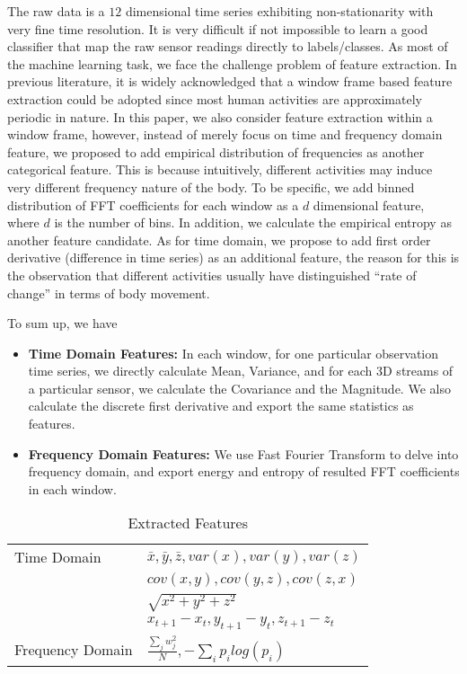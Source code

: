 The raw data is a $12$ dimensional time series exhibiting non-stationarity with very fine time resolution. It is very difficult if not impossible to learn a good classifier that map the raw sensor readings directly to labels/classes. As most of the machine learning task, we face the challenge problem of feature extraction. In previous literature, it is widely acknowledged that a window frame based feature extraction could be adopted since most human activities are approximately periodic in nature. In this paper, we also consider feature extraction within a window frame, however, instead of merely focus on time and frequency domain feature, we proposed to add empirical distribution of frequencies as another categorical  feature. This is because intuitively, different activities may induce very different frequency nature of the body. To be specific, we add binned distribution of FFT coefficients for each window as a $d$ dimensional feature, where $d$ is the number of bins. In addition, we calculate the empirical entropy as another feature candidate. As for time domain, we propose to add first order derivative (difference in time series) as an additional feature, the reason for this is the observation that different activities usually have distinguished ``rate of change'' in terms of body movement.

To sum up, we have
\begin{itemize}
\item \textbf{Time Domain Features:} In each window, for one particular observation time series, we directly calculate Mean, Variance, and for each 3D streams of a particular sensor, we calculate the Covariance and the Magnitude. We also calculate the discrete first derivative and export the same statistics as features. 
\item \textbf{Frequency Domain Features:} We use Fast Fourier Transform to delve into frequency domain, and export energy and entropy of resulted FFT coefficients in each window.
\end{itemize}

\begin{table}
\begin{center}
\begin{tabular}{|l|l|}
      \hline
      \hline
      Time Domain & $\bar{x},\bar{y},\bar{z},var(x),var(y),var(z)$\\
      &$cov(x,y),cov(y,z),cov(z,x)$\\
      &$\sqrt{x^2+y^2+z^2}$\\
      & $x_{t+1}-x_{t},y_{t+1}-y_{t},z_{t+1}-z_{t}$\\
  \hline
  Frequency Domain  & $\frac{\sum_j w_j^2}{N}, -\sum_i p_ilog(p_i)$  \\
  \hline
\end{tabular}
\end{center}
\caption{Extracted Features}
\end{table}

